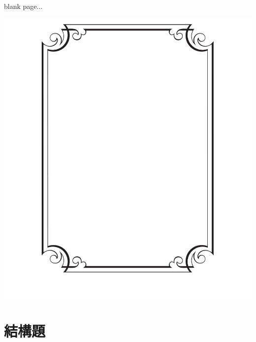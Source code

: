 \documentclass[class=exam, crop=false]{standalone}
\begin{document}
\vspace{.7cm}
\begin{center}
    blank page...

\end{center}
\bigskip \medskip
\par{\par\centering\includegraphics[width=\textwidth]{./img/ch1_weekend_wave_ex_2024-05-16-15-15-04.png}\par}
\clearpage

\setlength{\tabcolsep}{10pt}

\section{結構題}
\begin{questions}
    \ansdisplay
    \question {}
    \question {}
\end{questions}
\end{document}
